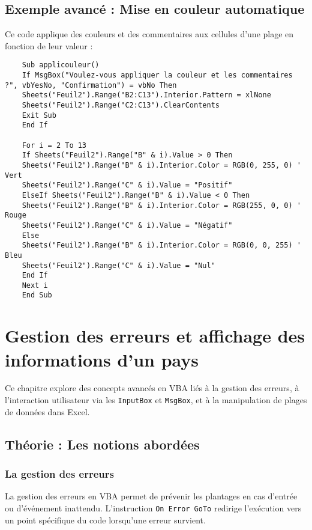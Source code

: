 \documentclass[a4paper,12pt]{report}
\begin{document}
\section{Exemple avancé : Mise en couleur automatique}

Ce code applique des couleurs et des commentaires aux cellules d'une plage en fonction de leur valeur :

\begin{lstlisting}
	Sub applicouleur()
	If MsgBox("Voulez-vous appliquer la couleur et les commentaires ?", vbYesNo, "Confirmation") = vbNo Then
	Sheets("Feuil2").Range("B2:C13").Interior.Pattern = xlNone
	Sheets("Feuil2").Range("C2:C13").ClearContents
	Exit Sub
	End If
	
	For i = 2 To 13
	If Sheets("Feuil2").Range("B" & i).Value > 0 Then
	Sheets("Feuil2").Range("B" & i).Interior.Color = RGB(0, 255, 0) ' Vert
	Sheets("Feuil2").Range("C" & i).Value = "Positif"
	ElseIf Sheets("Feuil2").Range("B" & i).Value < 0 Then
	Sheets("Feuil2").Range("B" & i).Interior.Color = RGB(255, 0, 0) ' Rouge
	Sheets("Feuil2").Range("C" & i).Value = "Négatif"
	Else
	Sheets("Feuil2").Range("B" & i).Interior.Color = RGB(0, 0, 255) ' Bleu
	Sheets("Feuil2").Range("C" & i).Value = "Nul"
	End If
	Next i
	End Sub
\end{lstlisting}

\chapter{Gestion des erreurs et affichage des informations d'un pays}

Ce chapitre explore des concepts avancés en VBA liés à la gestion des erreurs, à l'interaction utilisateur via les \texttt{InputBox} et \texttt{MsgBox}, et à la manipulation de plages de données dans Excel.

\section{Théorie : Les notions abordées}

\subsection{La gestion des erreurs}

La gestion des erreurs en VBA permet de prévenir les plantages en cas d'entrée ou d'événement inattendu. L'instruction \texttt{On Error GoTo} redirige l'exécution vers un point spécifique du code lorsqu'une erreur survient.
\end{document}
